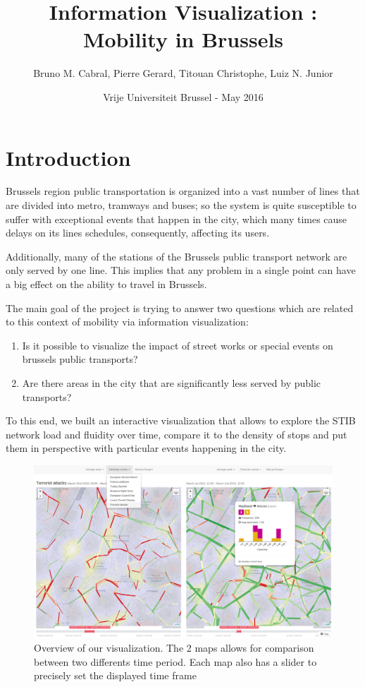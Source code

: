 \documentclass[11pt]{article}%
\begin{document}
\title{Information Visualization : Mobility in Brussels}
\author{Bruno M. Cabral, Pierre Gerard, Titouan Christophe, Luiz N. Junior}
\date{Vrije Universiteit Brussel - May 2016}
\maketitle


\section{Introduction}

Brussels region public transportation is organized into a vast number of lines that are divided into metro, tramways and buses; so the system is quite susceptible to suffer with exceptional events that happen in the city, which many times cause delays on its lines schedules, consequently, affecting its users.

Additionally, many of the stations of the Brussels public transport network are only served by one line. This implies that any problem in a single point can have a big effect on the ability to travel in Brussels.

The main goal of the project is trying to answer two questions which are related to this context of mobility via information visualization:

\begin{enumerate}
	\item Is it possible to visualize the impact of street works or special events on brussels public transports?
	\item Are there areas in the city that are significantly less served by public transports?
\end{enumerate}

To this end, we built an interactive visualization that allows to explore the STIB network load and fluidity over time, compare it to the density of stops and put them in perspective with particular events happening in the city.

\begin{figure}[H]
    \includegraphics[width=\textwidth]{images/comparison.png}
    \caption{Overview of our visualization. The 2 maps allows for comparison between two differents time period. Each map also has a slider to precisely set the displayed time frame}
  \end{figure}
\end{document}
